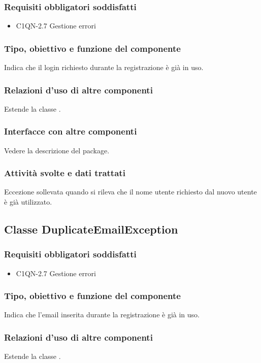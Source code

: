\subsubsection*{Requisiti obbligatori soddisfatti}
\begin{itemize}
	\item C1QN-2.7 Gestione errori
\end{itemize}
\subsubsection*{Tipo, obiettivo e funzione del componente}
Indica che il login richiesto durante la registrazione \`e gi\`a in uso.
\subsubsection*{Relazioni d'uso di altre componenti}
Estende la classe .
\subsubsection*{Interfacce con altre componenti}
Vedere la descrizione del package.
\subsubsection*{Attivit\`a svolte e dati trattati}
Eccezione sollevata quando si rileva che il nome utente richiesto dal nuovo
utente \`e gi\`a utilizzato.

\subsection{Classe DuplicateEmailException}
\subsubsection*{Requisiti obbligatori soddisfatti}
\begin{itemize}
	\item C1QN-2.7 Gestione errori
\end{itemize}
\subsubsection*{Tipo, obiettivo e funzione del componente}
Indica che l'email inserita durante la registrazione \`e gi\`a in uso.
\subsubsection*{Relazioni d'uso di altre componenti}
Estende la classe .

